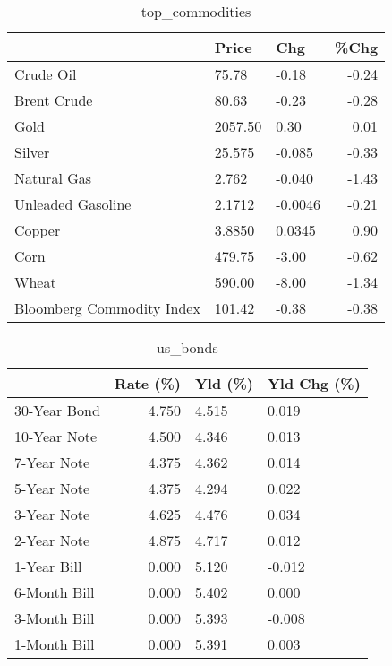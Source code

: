 \documentclass{article}%
\begin{document}
\begin{table}[htbp]%
\caption{top\_commodities}%
\centering%
\begin{adjustbox}{width=1\textwidth}%
\begin{tabular}{lllr}
\toprule
                          &   Price &     Chg &  \%Chg \\
\midrule
               Crude Oil  &   75.78 &   -0.18 & -0.24 \\
             Brent Crude  &   80.63 &   -0.23 & -0.28 \\
                    Gold  & 2057.50 &    0.30 &  0.01 \\
                  Silver  &  25.575 &  -0.085 & -0.33 \\
             Natural Gas  &   2.762 &  -0.040 & -1.43 \\
       Unleaded Gasoline  &  2.1712 & -0.0046 & -0.21 \\
                  Copper  &  3.8850 &  0.0345 &  0.90 \\
                    Corn  &  479.75 &   -3.00 & -0.62 \\
                   Wheat  &  590.00 &   -8.00 & -1.34 \\
Bloomberg Commodity Index &  101.42 &   -0.38 & -0.38 \\
\bottomrule
\end{tabular}
%
\end{adjustbox}%
\end{table}

%


\begin{table}[htbp]%
\caption{us\_bonds}%
\centering%
\begin{adjustbox}{width=1\textwidth}%
\begin{tabular}{lrll}
\toprule
             &  Rate (\%) & Yld (\%) & Yld Chg (\%) \\
\midrule
30-Year Bond &     4.750 &   4.515 &       0.019 \\
10-Year Note &     4.500 &   4.346 &       0.013 \\
 7-Year Note &     4.375 &   4.362 &       0.014 \\
 5-Year Note &     4.375 &   4.294 &       0.022 \\
 3-Year Note &     4.625 &   4.476 &       0.034 \\
 2-Year Note &     4.875 &   4.717 &       0.012 \\
 1-Year Bill &     0.000 &   5.120 &      -0.012 \\
6-Month Bill &     0.000 &   5.402 &       0.000 \\
3-Month Bill &     0.000 &   5.393 &      -0.008 \\
1-Month Bill &     0.000 &   5.391 &       0.003 \\
\bottomrule
\end{tabular}
%
\end{adjustbox}%
\end{table}
\end{document}
